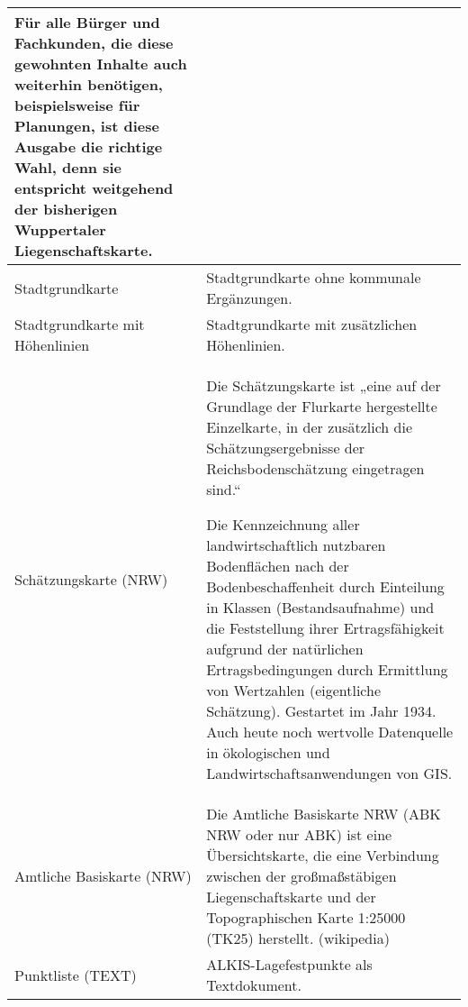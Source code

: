 \begin{longtable}{|p{}|p{}|}
Für alle Bürger und Fachkunden, die diese gewohnten Inhalte auch weiterhin benötigen, beispielsweise für Planungen, ist diese Ausgabe die richtige Wahl, denn sie entspricht weitgehend der bisherigen Wuppertaler Liegenschaftskarte. \autocite{wupp-alkis} \\
\hline
Stadtgrundkarte
&
Stadtgrundkarte ohne kommunale Ergänzungen. \\
\hline
Stadtgrundkarte mit Höhenlinien
&
Stadtgrundkarte mit zusätzlichen Höhenlinien. \\
\hline
Schätzungskarte (NRW)
&
Die Schätzungskarte ist „eine auf der Grundlage der Flurkarte hergestellte Einzelkarte, in der zusätzlich die Schätzungsergebnisse der Reichsbodenschätzung eingetragen sind.“  \autocite{gg-schaetzungskarte}

Die Kennzeichnung aller landwirtschaftlich nutzbaren Bodenflächen nach der Bodenbeschaffenheit durch Einteilung in Klassen (Bestandsaufnahme) und die Feststellung ihrer Ertragsfähigkeit aufgrund der natürlichen Ertragsbedingungen durch Ermittlung von Wertzahlen (eigentliche Schätzung). Gestartet im Jahr 1934. Auch heute noch wertvolle Datenquelle in ökologischen und Landwirtschaftsanwendungen von GIS. \autocite{gg-reichsbodenschaetzung} \\

\hline
Amtliche Basiskarte (NRW)
&
Die Amtliche Basiskarte NRW (ABK NRW oder nur ABK) ist eine Übersichtskarte, die eine Verbindung zwischen der großmaßstäbigen Liegenschaftskarte und der Topographischen Karte 1:25000 (TK25) herstellt. (wikipedia) \\
\hline
Punktliste (TEXT)
&
ALKIS-Lagefestpunkte als Textdokument.


\end{longtable}
